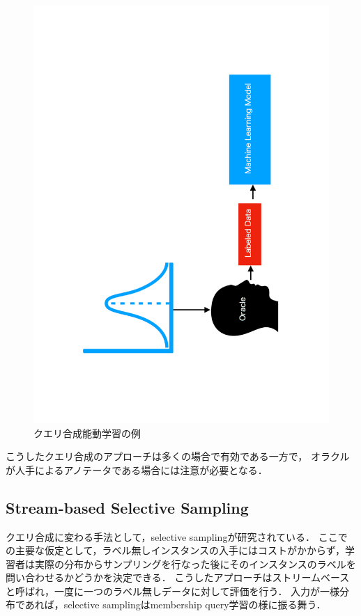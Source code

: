 \documentclass[11pt]{report}
\begin{document}
\begin{figure}[h]
\begin{center}
\includegraphics[bb=100 0 500 850, scale=0.4, angle=270]{./images/fig3.pdf}
\vspace{5mm}
\caption{クエリ合成能動学習の例}
\label{fig3}
\end{center}
\end{figure}

こうしたクエリ合成のアプローチは多くの場合で有効である一方で，
オラクルが人手によるアノテータである場合には注意が必要となる\cite{baum1992query}．

\subsection{Stream-based Selective Sampling}
クエリ合成に変わる手法として，selective sampling\cite{atlas1990training}が研究されている．
ここでの主要な仮定として，ラベル無しインスタンスの入手にはコストがかからず，学習者は実際の分布からサンプリングを行なった後にそのインスタンスのラベルを問い合わせるかどうかを決定できる．
こうしたアプローチはストリームベースと呼ばれ，一度に一つのラベル無しデータに対して評価を行う．
入力が一様分布であれば，selective samplingはmembership query学習の様に振る舞う．
\end{document}
